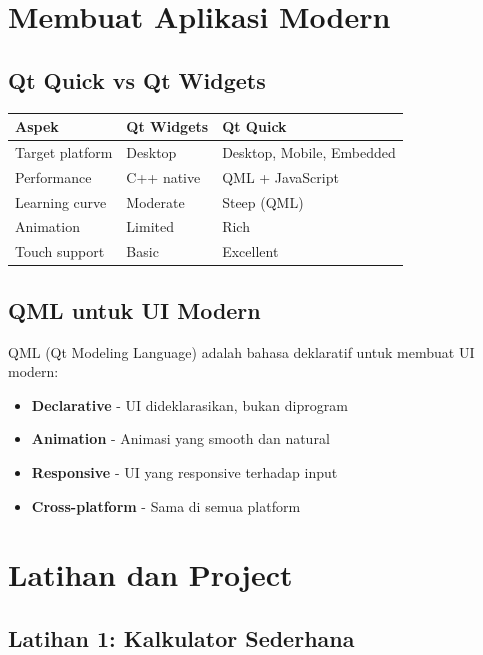 \section{Membuat Aplikasi Modern}

\subsection{Qt Quick vs Qt Widgets}

\begin{center}
\begin{tabular}{|l|l|l|}
\hline
\textbf{Aspek} & \textbf{Qt Widgets} & \textbf{Qt Quick} \\
\hline
Target platform & Desktop & Desktop, Mobile, Embedded \\
\hline
Performance & C++ native & QML + JavaScript \\
\hline
Learning curve & Moderate & Steep (QML) \\
\hline
Animation & Limited & Rich \\
\hline
Touch support & Basic & Excellent \\
\hline
\end{tabular}
\end{center}

\subsection{QML untuk UI Modern}

QML (Qt Modeling Language) adalah bahasa deklaratif untuk membuat UI modern:
\begin{itemize}
\item \textbf{Declarative} - UI dideklarasikan, bukan diprogram
\item \textbf{Animation} - Animasi yang smooth dan natural
\item \textbf{Responsive} - UI yang responsive terhadap input
\item \textbf{Cross-platform} - Sama di semua platform
\end{itemize}

\section{Latihan dan Project}

\subsection{Latihan 1: Kalkulator Sederhana}

